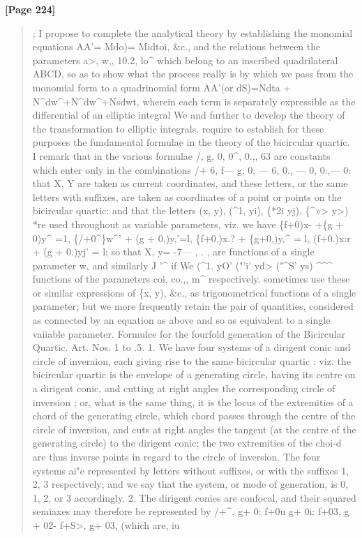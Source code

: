 \documentclass[11pt,a4paper]{book}
\begin{document}
\textbf{[Page 224]}\\[0.2cm]
\begin{quote}
;
I propose to complete the analytical theory by establishing the monomial equations
AA'= Mdo)= Midtoi, \&c., and the relations between the parameters a>, w,, 10.2, lo\textasciicircum{} which
belong to an inscribed quadrilateral ABCD, so as to show what the process really is
by which we pass from the monomial form to a quadrinomial form
AA'(or dS)=Ndta + N\textasciicircum{}dw\textasciicircum{}+N\textasciicircum{}dw\textasciicircum{}+Nsdwt,
wherein each term is separately expressible as the differential of an elliptic integral
We
and further to develop the theory of the transformation to elliptic integrals.
require to establish for these purposes the fundamental formulae in the theory of the
bicircular quartic.
I remark that in the various formulae /, g, 0, 0\textasciicircum{}, 0.,, 63 are constants which enter
only in the combinations /+ 6, f--- g, 0, --- 6, 0., --- 0, 0:,--- 0: that X, Y are taken as
current coordinates, and these letters, or the same letters with suffixes, are taken as
coordinates of a point or points on the bicircular quartic: and that the letters (x, y),
(\textasciicircum{}1, yi), \{*2i yj). \{\textasciicircum{}»> y>) *re used throughout as variable parameters, viz. we have
\{f+0)x- +\{g + 0)y\textasciicircum{} =1,
\{/+0\textasciicircum{}\}w\textasciicircum{}' + (g + 0,)y,'=l,
\{f+0,)x.? + \{g+0,)y,\textasciicircum{} = l,
(f+0.)x:r + (g + 0.)yj' = l;
so that X, y= -7--- , . , are functions of a single parameter w, and similarly
J '\textasciicircum{} if We
(\textasciicircum{}1. yO' ("'i' yd> ("\textasciicircum{}S' ys) \textasciicircum{}\textasciicircum{}\textasciicircum{} functions of the parameters coi, co.,, m\textasciicircum{} respectively.
sometimes use these or similar expressions of \{x, y), \&c., as trigonometrical functions
of a single parameter; but we more frequently retain the pair of quantities, considered
as connected by an equation as above and so as equivalent to a single vaiiable
parameter.
Formulce for the fourfold generation of the Bicircular Quartic. Art. Nos. 1 to .5.
1. We have four systems of a dirigent conic and circle of inveraion, each giving
rise to the same bicircular quartic : viz. the bicircular quartic is the envelope of a
generating circle, having its centre on a dirigent conic, and cutting at right angles
the corresponding circle of inversion ; or, what is the same thing, it is the locus of
the extremities of a chord of the generating circle, which chord passes through the
centre of the circle of inversion, and cuts at right angles the tangent (at the centre
of the generating circle) to the dirigent conic; the two extremities of the choi-d are
thus inverse points in regard to the circle of inversion. The four systems ai"e
represented by letters without suffixes, or with the suffixes 1, 2, 3 respectively; and
we say that the system, or mode of generation, is 0, 1, 2, or 3 accordingly.
2. The dirigent conies are confocal, and their squared semiaxes may therefore be
represented by /+\textasciicircum{}, g+ 0: f+0u g+ 0i: f+03, g + 02- f+S>, g+ 03, (which are, iu
\end{quote}
\end{document}
